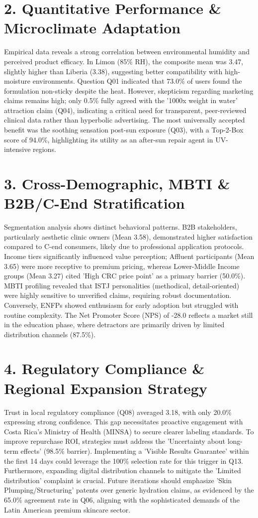 \documentclass[10pt,twocolumn,a4paper]{article}
\begin{document}
\section{2. Quantitative Performance \& Microclimate Adaptation}
Empirical data reveals a strong correlation between environmental humidity and perceived product efficacy. In Limon (85\% RH), the composite mean was 3.47, slightly higher than Liberia (3.38), suggesting better compatibility with high-moisture environments. Question Q01 indicated that 73.0\% of users found the formulation non-sticky despite the heat. However, skepticism regarding marketing claims remains high; only 0.5\% fully agreed with the '1000x weight in water' attraction claim (Q04), indicating a critical need for transparent, peer-reviewed clinical data rather than hyperbolic advertising. The most universally accepted benefit was the soothing sensation post-sun exposure (Q03), with a Top-2-Box score of 94.0\%, highlighting its utility as an after-sun repair agent in UV-intensive regions.
\section{3. Cross-Demographic, MBTI \& B2B/C-End Stratification}
Segmentation analysis shows distinct behavioral patterns. B2B stakeholders, particularly aesthetic clinic owners (Mean 3.58), demonstrated higher satisfaction compared to C-end consumers, likely due to professional application protocols. Income tiers significantly influenced value perception; Affluent participants (Mean 3.65) were more receptive to premium pricing, whereas Lower-Middle Income groups (Mean 3.27) cited 'High CRC price point' as a primary barrier (50.0\%). MBTI profiling revealed that ISTJ personalities (methodical, detail-oriented) were highly sensitive to unverified claims, requiring robust documentation. Conversely, ENFPs showed enthusiasm for early adoption but struggled with routine complexity. The Net Promoter Score (NPS) of -28.0 reflects a market still in the education phase, where detractors are primarily driven by limited distribution channels (87.5\%).
\section{4. Regulatory Compliance \& Regional Expansion Strategy}
Trust in local regulatory compliance (Q08) averaged 3.18, with only 20.0\% expressing strong confidence. This gap necessitates proactive engagement with Costa Rica’s Ministry of Health (MINSA) to secure clearer labeling standards. To improve repurchase ROI, strategies must address the 'Uncertainty about long-term effects' (98.5\% barrier). Implementing a 'Visible Results Guarantee' within the first 14 days could leverage the 100\% selection rate for this trigger in Q13. Furthermore, expanding digital distribution channels to mitigate the 'Limited distribution' complaint is crucial. Future iterations should emphasize 'Skin Plumping/Structuring' patents over generic hydration claims, as evidenced by the 65.0\% agreement rate in Q06, aligning with the sophisticated demands of the Latin American premium skincare sector.
\end{document}
